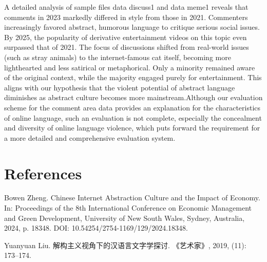 \documentclass[12pt,a4paper]{ctexart}
\theoremstyle{MyLineTheoremStyle}
\theoremstyle{MyBlockTheoremStyle}
\theoremstyle{MySubsubsectionStyle}
\begin{document}
A detailed analysis of sample files data discuss1 and data meme1 reveals that comments in 2023 markedly differed in style from those in 2021. Commenters increasingly favored abstract, humorous language to critique serious social issues. By 2025, the popularity of derivative entertainment videos on this topic even surpassed that of 2021. The focus of discussions shifted from real-world issues (such as stray animals) to the internet-famous cat itself, becoming more lighthearted and less satirical or metaphorical. Only a minority remained aware of the original context, while the majority engaged purely for entertainment. This aligns with our hypothesis that the violent potential of abstract language diminishes as abstract culture becomes more mainstream.Although our evaluation scheme for the comment area data provides an explanation for the characteristics of online language, such an evaluation is not complete, especially the concealment and diversity of online language violence, which puts forward the requirement for a more detailed and comprehensive evaluation system.

\section{References}

\begin{thebibliography}{99} %

Bowen Zheng.
\newblock Chinese Internet Abstraction Culture and the Impact of Economy.
\newblock In: Proceedings of the 8th International Conference on Economic Management and Green Development, University of New South Wales, Sydney, Australia, 2024, p. 18348.
\newblock DOI: 10.54254/2754-1169/129/2024.18348.

Yuanyuan Liu.
\newblock 解构主义视角下的汉语言文字学探讨.
\newblock 《艺术家》, 2019, (11): 173--174.

\end{thebibliography}
\end{document}
